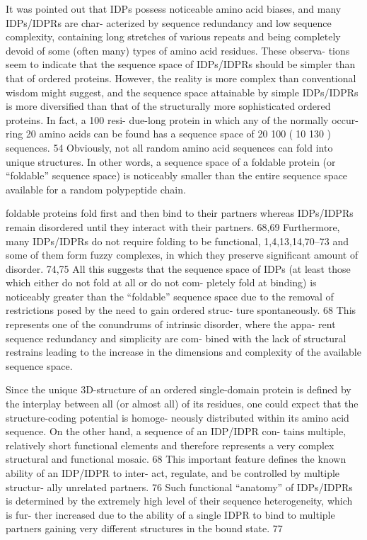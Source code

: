 It was pointed out that IDPs possess noticeable
amino acid biases, and many IDPs/IDPRs are char-
acterized by sequence redundancy and low sequence
complexity, containing long stretches of various
repeats and being completely devoid of some (often
many) types of amino acid residues. These observa-
tions seem to indicate that the sequence space of
IDPs/IDPRs should be simpler than that of ordered
proteins.
However, the reality is more complex than
conventional wisdom might suggest, and the
sequence space attainable by simple IDPs/IDPRs is
more diversified than that of the structurally more
sophisticated ordered proteins.
In fact, a 100 resi-
due-long protein in which any of the normally occur-
ring 20 amino acids can be found has a sequence
space of 20 100 (10 130 ) sequences. 54 Obviously, not
all random amino acid sequences can fold into
unique structures. In other words, a sequence space
of a foldable protein (or “foldable” sequence space) is
noticeably smaller than the entire sequence space
available for a random polypeptide chain.

foldable proteins fold first and
then bind to their partners whereas IDPs/IDPRs
remain disordered until they interact with their
partners. 68,69 Furthermore, many IDPs/IDPRs do
not require folding to be functional, 1,4,13,14,70–73 and
some of them form fuzzy complexes, in which they
preserve significant amount of disorder. 74,75 All this
suggests that the sequence space of IDPs (at least
those which either do not fold at all or do not com-
pletely fold at binding) is noticeably greater than
the “foldable” sequence space due to the removal of
restrictions posed by the need to gain ordered struc-
ture spontaneously. 68 This represents one of the
conundrums of intrinsic disorder, where the appa-
rent sequence redundancy and simplicity are com-
bined with the lack of structural restrains leading to
the increase in the dimensions and complexity of the
available sequence space.




Since the unique 3D-structure of an ordered
single-domain protein is defined by the interplay
between all (or almost all) of its residues, one could
expect that the structure-coding potential is homoge-
neously distributed within its amino acid sequence.
On the other hand, a sequence of an IDP/IDPR con-
tains multiple, relatively short functional elements
and therefore represents a very complex structural
and functional mosaic. 68 This important feature
defines the known ability of an IDP/IDPR to inter-
act, regulate, and be controlled by multiple structur-
ally unrelated partners. 76 Such functional “anatomy”
of IDPs/IDPRs is determined by the extremely high
level of their sequence heterogeneity, which is fur-
ther increased due to the ability of a single IDPR to
bind to multiple partners gaining very different
structures in the bound state. 77




